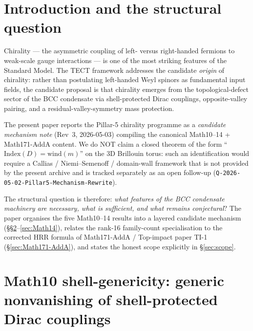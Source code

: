 \maketitle

\section{Introduction and the structural question}\label{sec:intro}

Chirality --- the asymmetric coupling of left- versus right-handed
fermions to weak-scale gauge interactions --- is one of the most
striking features of the Standard Model. The TECT framework
addresses the candidate \emph{origin} of chirality: rather than
postulating left-handed Weyl spinors as fundamental input fields, the
candidate proposal is that chirality emerges from the
topological-defect sector of the BCC condensate via shell-protected
Dirac couplings, opposite-valley pairing, and a residual-valley-symmetry
mass protection.

The present paper reports the Pillar-5 chirality programme as a
\emph{candidate mechanism note} (Rev~3, 2026-05-03) compiling the
canonical Math10--14 + Math171-AddA content. We do NOT claim a
closed theorem of the form ``$\mathrm{Index}(D) = \mathrm{wind}(m)$''
on the 3D Brillouin torus: such an identification would require a
Callias / Niemi--Semenoff / domain-wall framework that is not
provided by the present archive and is tracked separately as an open
follow-up
(\texttt{Q-2026-05-02-Pillar5-Mechanism-Rewrite}).

The structural question is therefore: \emph{what features of the
BCC condensate machinery are necessary, what is sufficient, and what
remains conjectural}? The paper organises the five Math10--14
results into a layered candidate mechanism (\S\S\ref{sec:Math10}--\ref{sec:Math14}),
relates the rank-16 family-count specialisation to the corrected
HRR formula of Math171-AddA / Top-impact paper TI-1
(\S\ref{sec:Math171-AddA}), and states the honest scope explicitly
in \S\ref{sec:scope}.

\section{Math10 shell-genericity: generic nonvanishing of
shell-protected Dirac couplings}\label{sec:Math10}

